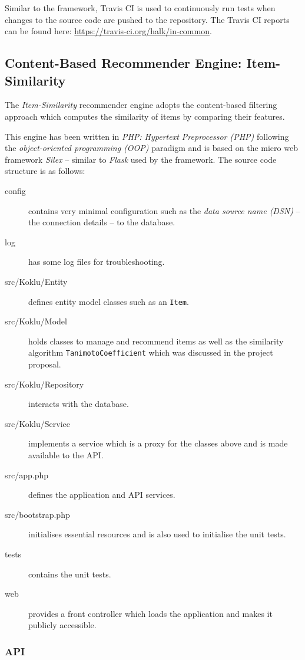 Similar to the framework, Travis CI is used to continuously run tests when changes to the source code are pushed to the repository. The Travis CI reports can be found here: \url{https://travis-ci.org/halk/in-common}.

\subsection{Content-Based Recommender Engine: Item-Similarity}

The \emph{Item-Similarity} recommender engine adopts the content-based filtering approach which computes the similarity of items by comparing their features.

This engine has been written in \emph{PHP: Hypertext Preprocessor (PHP)} following the \emph{object-oriented programming (OOP)} paradigm and is based on the micro web framework \emph{Silex} -- similar to \emph{Flask} used by the framework. The source code structure is as follows:

\begin{description}
    \item[config] contains very minimal configuration such as the \emph{data source name (DSN)} -- the connection details -- to the database.
    \item[log] has some log files for troubleshooting.
    \item[src/Koklu/Entity] defines entity model classes such as an \texttt{Item}.
    \item[src/Koklu/Model] holds classes to manage and recommend items as well as the similarity algorithm \texttt{TanimotoCoefficient} which was discussed in the project proposal.
    \item[src/Koklu/Repository] interacts with the database.
    \item[src/Koklu/Service] implements a service which is a proxy for the classes above and is made available to the API.
    \item[src/app.php] defines the application and API services.
    \item[src/bootstrap.php] initialises essential resources and is also used to initialise the unit tests.
    \item[tests] contains the unit tests.
    \item[web] provides a front controller which loads the application and makes it publicly accessible.
\end{description}

\subsubsection{API}

